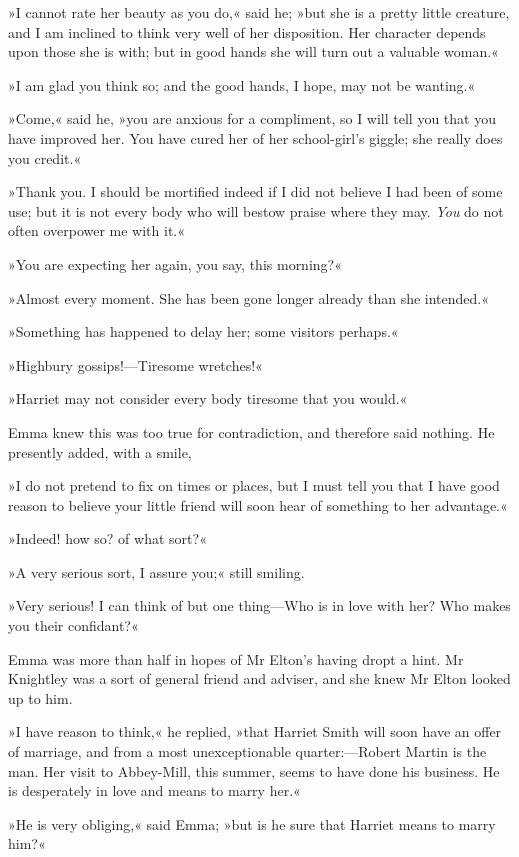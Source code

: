 »I cannot rate her beauty as you do,« said he; »but she is a pretty little creature, and I am inclined to think very well of her disposition. Her character depends upon those she is with; but in good hands she will turn out a valuable woman.«

»I am glad you think so; and the good hands, I hope, may not be wanting.«

»Come,« said he, »you are anxious for a compliment, so I will tell you that you have improved her. You have cured her of her school-girl's giggle; she really does you credit.«

»Thank you. I should be mortified indeed if I did not believe I had been of some use; but it is not every body who will bestow praise where they may. \textit{You} do not often overpower me with it.«

»You are expecting her again, you say, this morning?«

»Almost every moment. She has been gone longer already than she intended.«

»Something has happened to delay her; some visitors perhaps.«

»Highbury gossips!—Tiresome wretches!«

»Harriet may not consider every body tiresome that you would.«

Emma knew this was too true for contradiction, and therefore said nothing. He presently added, with a smile,

»I do not pretend to fix on times or places, but I must tell you that I have good reason to believe your little friend will soon hear of something to her advantage.«

»Indeed! how so? of what sort?«

»A very serious sort, I assure you;« still smiling.

»Very serious! I can think of but one thing—Who is in love with her? Who makes you their confidant?«

Emma was more than half in hopes of Mr Elton's having dropt a hint. Mr Knightley was a sort of general friend and adviser, and she knew Mr Elton looked up to him.

»I have reason to think,« he replied, »that Harriet Smith will soon have an offer of marriage, and from a most unexceptionable quarter:—Robert Martin is the man. Her visit to Abbey-Mill, this summer, seems to have done his business. He is desperately in love and means to marry her.«

»He is very obliging,« said Emma; »but is he sure that Harriet means to marry him?«

